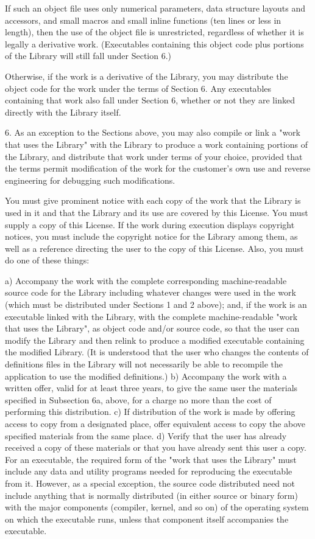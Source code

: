\begin{DoxyVerb}
If such an object file uses only numerical parameters, data structure layouts and accessors, and
small macros and small inline functions (ten lines or less in length), then the use of the object
file is unrestricted, regardless of whether it is legally a derivative work. (Executables containing
this object code plus portions of the Library will still fall under Section 6.)

Otherwise, if the work is a derivative of the Library, you may distribute the object code for the
work under the terms of Section 6. Any executables containing that work also fall under Section 6,
whether or not they are linked directly with the Library itself.

6. As an exception to the Sections above, you may also compile or link a "work that uses the
Library" with the Library to produce a work containing portions of the Library, and distribute that
work under terms of your choice, provided that the terms permit modification of the work for the
customer's own use and reverse engineering for debugging such modifications.

You must give prominent notice with each copy of the work that the Library is used in it and that
the Library and its use are covered by this License. You must supply a copy of this License. If the
work during execution displays copyright notices, you must include the copyright notice for the
Library among them, as well as a reference directing the user to the copy of this License. Also, you
must do one of these things:

a) Accompany the work with the complete corresponding machine-readable source code for the Library
including whatever changes were used in the work (which must be distributed under Sections 1 and 2
above); and, if the work is an executable linked with the Library, with the complete
machine-readable "work that uses the Library", as object code and/or source code, so that the user
can modify the Library and then relink to produce a modified executable containing the modified
Library. (It is understood that the user who changes the contents of definitions files in the
Library will not necessarily be able to recompile the application to use the modified definitions.)
b) Accompany the work with a written offer, valid for at least three years, to give the same user
the materials specified in Subsection 6a, above, for a charge no more than the cost of performing
this distribution.
c) If distribution of the work is made by offering access to copy from a designated place, offer
equivalent access to copy the above specified materials from the same place.
d) Verify that the user has already received a copy of these materials or that you have already sent
this user a copy.
For an executable, the required form of the "work that uses the Library" must include any data and
utility programs needed for reproducing the executable from it. However, as a special exception, the
source code distributed need not include anything that is normally distributed (in either source or
binary form) with the major components (compiler, kernel, and so on) of the operating system on
which the executable runs, unless that component itself accompanies the executable.


\end{DoxyVerb}
